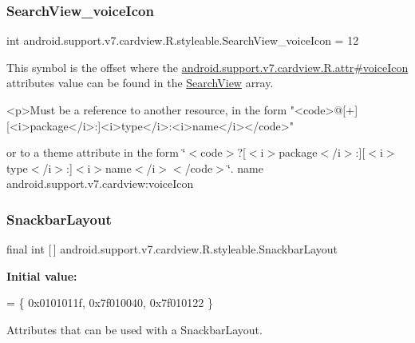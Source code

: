 \subsubsection{\texorpdfstring{Search\+View\+\_\+voice\+Icon}{SearchView\_voiceIcon}}
{\footnotesize\ttfamily int android.\+support.\+v7.\+cardview.\+R.\+styleable.\+Search\+View\+\_\+voice\+Icon = 12\hspace{0.3cm}{\ttfamily [static]}}

This symbol is the offset where the \hyperlink{classandroid_1_1support_1_1v7_1_1cardview_1_1R_1_1attr_a41d30edeb1f59d1e42791fa7ce86ce17}{android.\+support.\+v7.\+cardview.\+R.\+attr\#voice\+Icon} attribute\textquotesingle{}s value can be found in the \hyperlink{classandroid_1_1support_1_1v7_1_1cardview_1_1R_1_1styleable_a6a300ecad88f70a7642265f73ff4d33f}{Search\+View} array.

\begin{DoxyVerb}      <p>Must be a reference to another resource, in the form "<code>@[+][<i>package</i>:]<i>type</i>:<i>name</i></code>"
\end{DoxyVerb}
 or to a theme attribute in the form \char`\"{}$<$code$>$?\mbox{[}$<$i$>$package$<$/i$>$\+:\mbox{]}\mbox{[}$<$i$>$type$<$/i$>$\+:\mbox{]}$<$i$>$name$<$/i$>$$<$/code$>$\char`\"{}.  name android.\+support.\+v7.\+cardview\+:voice\+Icon \mbox{\label{classandroid_1_1support_1_1v7_1_1cardview_1_1R_1_1styleable_aab664bb57daef291febbbab9c49f8fbf}} 
\subsubsection{\texorpdfstring{Snackbar\+Layout}{SnackbarLayout}}
{\footnotesize\ttfamily final int \mbox{[}$\,$\mbox{]} android.\+support.\+v7.\+cardview.\+R.\+styleable.\+Snackbar\+Layout\hspace{0.3cm}{\ttfamily [static]}}

{\bfseries Initial value\+:}
\begin{DoxyCode}
= \{
            0x0101011f, 0x7f010040, 0x7f010122
        \}
\end{DoxyCode}
Attributes that can be used with a Snackbar\+Layout. 

